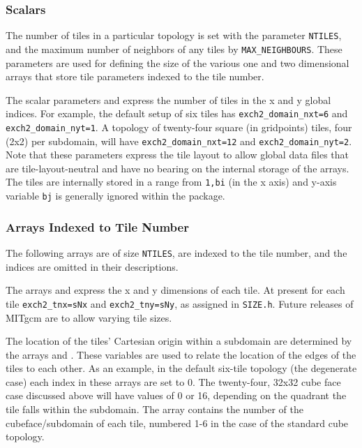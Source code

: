 \subsubsection{Scalars}

The number of tiles in a particular topology is set with the parameter
\texttt{NTILES}, and the maximum number of neighbors of any tiles by
\texttt{MAX\_NEIGHBOURS}.  These parameters are used for defining the
size of the various one and two dimensional arrays that store tile
parameters indexed to the tile number.

The scalar parameters 
and  express the number
of tiles in the x and y global indices.  For example, the default
setup of six tiles has \texttt{exch2\_domain\_nxt=6} and
\texttt{exch2\_domain\_nyt=1}.  A topology of twenty-four square (in
gridpoints) tiles, four (2x2) per subdomain, will have
\texttt{exch2\_domain\_nxt=12} and \texttt{exch2\_domain\_nyt=2}.
Note that these parameters express the tile layout to allow global
data files that are tile-layout-neutral and have no bearing on the
internal storage of the arrays.  The tiles are internally stored in a
range from \texttt{1,bi} (in the x axis) and y-axis variable
\texttt{bj} is generally ignored within the package.

\subsubsection{Arrays Indexed to Tile Number}

The following arrays are of size \texttt{NTILES}, are indexed to the
tile number, and the indices are omitted in their descriptions.

The arrays  and
 express the x and y dimensions of each
tile.  At present for each tile \texttt{exch2\_tnx=sNx} and
\texttt{exch2\_tny=sNy}, as assigned in \texttt{SIZE.h}.  Future
releases of MITgcm are to allow varying tile sizes.

The location of the tiles' Cartesian origin within a subdomain are
determined by the arrays  and
.  These variables are used to
relate the location of the edges of the tiles to each other.  As an
example, in the default six-tile topology (the degenerate case) each
index in these arrays are set to 0.  The twenty-four, 32x32 cube face
case discussed above will have values of 0 or 16, depending on the
quadrant the tile falls within the subdomain.  The array 
 contains the number of the
cubeface/subdomain of each tile, numbered 1-6 in the case of the
standard cube topology.

